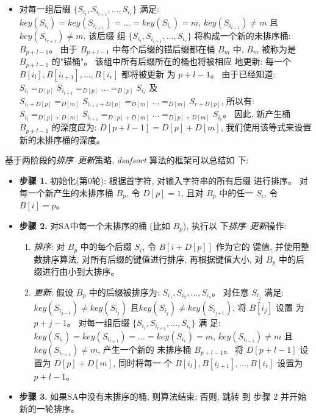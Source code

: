 \begin{itemize}
\begin{itemize}
\item 对每一组后缀 $\{S_{i_l}, S_{i_{l+1}},\dots,S_{i_r}\}$ 满足:
  $key(S_{i_l}) = key(S_{i_{l+1}}) = \dots = key(S_{i_r}) = m$,
  $key(S_{i_{l-1}}) \neq m$ 且 $key(S_{i_{r+1}}) \neq m$, 该后缀
  组 $\{S_{i_l}, S_{i_{l+1}},\dots,S_{i_r}\}$ 将构成一个新的未排序桶:
  $B_{p+l-1}$。 由于 $B_{p+l-1}$ 中每个后缀的锚后缀都在桶 $B_m$ 中,
  $B_m$ 被称为是 $B_{p+l-1}$ 的"锚桶"。 该组中所有后缀所在的桶也将被相应
  地更新: 每一个 $B[i_l], B[i_{l+1}], \dots, B[i_r]$ 都将被更新
  为 $p+l-1$。  由于已经知道:
  $S_{i_l} =_{D[p]} S_{i_{l+1}} =_{D[p]} \dots =_{D[p]}
  S_{i_r}$ 及
  $S_{i_l+D[p]} =_{D[m]} S_{i_{l+1}+D[p]} =_{D[m]} \dots =_{D[m]}
  S_{r+D[p]}$, 所以有:
  $S_{i_l} =_{D[p]+D[m]} S_{i_{l+1}} =_{D[p]+D[m]} \dots =_{D[p]+D[m]}
  S_{i_r}$。  因此, 新产生桶 $B_{p+l-1}$ 的深度应为: $D[p+l-1] = D[p] +
  D[m]$, 我们使用该等式来设置新的未排序桶的深度。
\end{itemize}

\end{itemize}


基于两阶段的\emph{排序--更新}策略, \emph{dsufsort} 算法的框架可以总结如
下:

\begin{itemize}

\item \textbf{步骤 1.} 初始化(第0轮): 根据首字符, 对输入字符串的所有后缀
  进行排序。 对每一个新产生的未排序桶 $B_p$, 令 $D[p] = 1$, 且对 $B_p$
  中的任一 $S_i$, 令 $B[i] = p$。

\item \textbf{步骤 2.} 对SA中每一个未排序的桶 (比如 $B_p$), 执行以
  下\emph{排序--更新}操作:

\begin{enumerate}
\item \emph{排序}: 对 $B_p$ 中的每个后缀 $S_i$, 令 $B[i+D[p]]$ 作为它的
  键值, 并使用整数排序算法, 对所有后缀的键值进行排序, 再根据键值大小,
  对 $B_p$ 中的后缀进行由小到大排序。
\item \emph{更新}: 假设 $B_p$ 中的后缀被排序为: $S_{i_1},
  S_{i_2},\dots,S_{i_s}$。 对任意 $S_{i_j}$ 满足:
  $key(S_{i_{j-1}}) \neq key(S_{i_j})$
  且$key(S_{i_j}) \neq key(S_{i_{j+1}})$, 将 $B[i_j]$ 设置
  为 $p+j-1$。 对每一组后缀 $\{S_{i_l}, S_{i_{l+1}},\dots,S_{i_r}\}$ 满
  足: $key(S_{i_l}) = key(S_{i_{l+1}}) = \dots = key(S_{i_r}) = m$,
  $key(S_{i_{l-1}}) \neq m$ 且 $key(S_{i_{r+1}}) \neq m$, 产生一个新的
  未排序桶 $B_{p+l-1}$。 将 $D[p+l-1]$ 设置为 $D[p] + D[m]$, 同时将每一
  个 $B[i_l], B[i_{l+1}], \dots, B[i_r]$ 设置为 $p+l-1$。
\end{enumerate}

\item \textbf{步骤 3.} 如果SA中没有未排序的桶, 则算法结束; 否则, 跳转
  到 步骤 2 并开始新的一轮排序。

\end{itemize}

